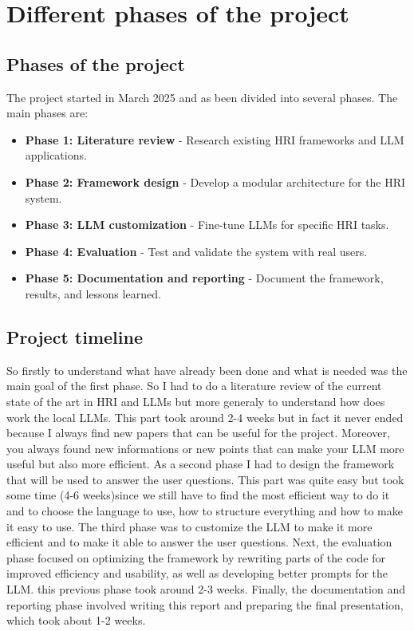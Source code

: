 \section{Different phases of the project}

\subsection{Phases of the project}
The project started in March 2025 and as been divided into several phases.
The main phases are:
\begin{itemize}
    \item \textbf{Phase 1: Literature review} - Research existing HRI frameworks and LLM applications.
    \item \textbf{Phase 2: Framework design} - Develop a modular architecture for the HRI system.
    \item \textbf{Phase 3: LLM customization} - Fine-tune LLMs for specific HRI tasks.
    \item \textbf{Phase 4: Evaluation} - Test and validate the system with real users.
    \item \textbf{Phase 5: Documentation and reporting} - Document the framework, results, and lessons learned.
\end{itemize}

\subsection{Project timeline}
So firstly to understand what have already been done and what is needed was the main goal of the first phase.
So I had to do a literature review of the current state of the art in HRI and LLMs but more generaly to understand how does work the local LLMs.
This part took around 2-4 weeks but in fact it never ended because I always find new papers that can be useful for the project.
Moreover, you always found new informations or new points that can make your LLM more useful but also more efficient.
As a second phase I had to design the framework that will be used to answer the user questions.
This part was quite easy but took some time (4-6 weeks)since we still have to find the most efficient way to do it and to choose the language to use, how to structure everything and how to make it easy to use.
The third phase was to customize the LLM to make it more efficient and to make it able to answer the user questions.
Next, the evaluation phase focused on optimizing the framework by rewriting parts of the code for improved efficiency and usability, as well as developing better prompts for the LLM.
this previous phase took around 2-3 weeks.
Finally, the documentation and reporting phase involved writing this report and preparing the final presentation, which took about 1-2 weeks.
